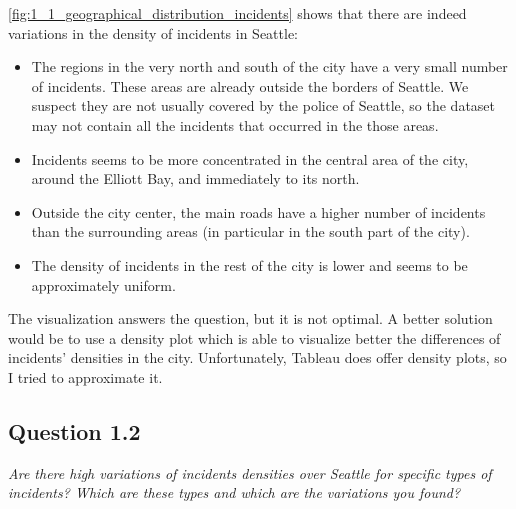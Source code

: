 \cref{fig:1_1_geographical_distribution_incidents} shows that there are indeed variations in the density of incidents in Seattle:
\begin{itemize}
    \item The regions in the very north and south of the city have a very small number of incidents. These areas are already outside the borders of Seattle. We suspect they are not usually covered by the police of Seattle, so the dataset may not contain all the incidents that occurred in the those areas.
    \item Incidents seems to be more concentrated in the central area of the city, around the Elliott Bay, and immediately to its north.
    \item Outside the city center, the main roads have a higher number of incidents than the surrounding areas (in particular in the south part of the city).
    \item The density of incidents in the rest of the city is lower and seems to be approximately uniform.
\end{itemize}

The visualization answers the question, but it is not optimal.
A better solution would be to use a density plot which is able to visualize better the differences of incidents' densities in the city.
Unfortunately, Tableau does offer density plots, so I tried to approximate it.

\subsection*{Question 1.2}
\textit{Are there high variations of incidents densities over Seattle for specific types of incidents? Which are these types and which are the variations you found?}
